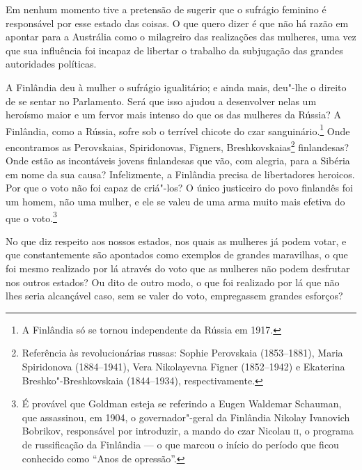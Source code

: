 Em nenhum momento tive a pretensão de sugerir que o sufrágio feminino é
responsável por esse estado das coisas. O que quero dizer é que não há
razão em apontar para a Austrália como o milagreiro das realizações das
mulheres, uma vez que sua influência foi incapaz de libertar o
trabalho da subjugação das grandes autoridades políticas.

A Finlândia deu à mulher o sufrágio igualitário; e ainda mais, deu"-lhe o
direito de se sentar no Parlamento. Será que isso ajudou a desenvolver
nelas um heroísmo maior e um fervor mais intenso do que os das
mulheres da Rússia? A Finlândia, como a Rússia, sofre sob o terrível
chicote do czar sanguinário.\footnote{A Finlândia só se tornou
  independente da Rússia em 1917.} Onde encontramos as Perovskaias,
Spiridonovas, Figners, Breshkovskaias\footnote{Referência
  às revolucionárias russas: Sophie Perovskaia (1853--1881), Maria
  Spiridonova (1884--1941), Vera Nikolayevna Figner (1852--1942)
  e Ekaterina Breshko"-Breshkovskaia (1844--1934), respectivamente.
  }
finlandesas? Onde estão as incontáveis jovens finlandesas que vão, com
alegria, para a Sibéria em nome da sua causa? Infelizmente, a
Finlândia precisa de libertadores heroicos. Por que o voto não foi capaz
de criá"-los? O único justiceiro do povo finlandês foi um homem, não uma
mulher, e ele se valeu de uma arma muito mais efetiva do que o
voto.\footnote{É provável que Goldman esteja se referindo a Eugen
  Waldemar Schauman, que assassinou, em 1904, o governador"-geral da
  Finlândia Nikolay Ivanovich Bobrikov, responsável por introduzir, a
  mando do czar Nicolau \textsc{ii}, o programa de russificação da Finlândia --- o
  que marcou o início do período que ficou conhecido como ``Anos de
  opressão''.}

No que diz respeito aos nossos estados, nos quais as mulheres já podem votar, e
que constantemente são apontados como exemplos de grandes maravilhas, o
que foi mesmo realizado por lá através do voto que as mulheres não podem
desfrutar nos outros estados? Ou dito de outro modo, o que foi realizado
por lá que não lhes seria alcançável caso, sem se valer do
voto, empregassem grandes esforços?

